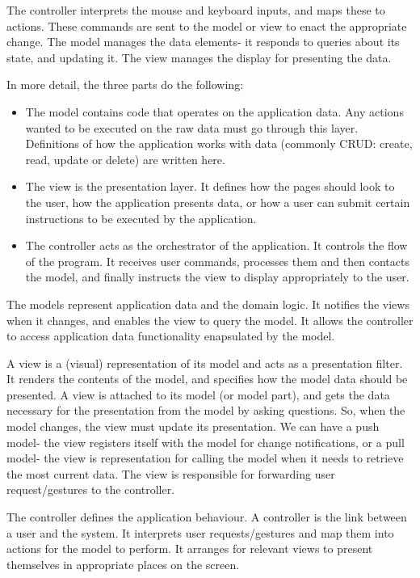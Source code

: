 \documentclass[a4paper, openany]{memoir}
\begin{document}
\noindent The controller interprets the mouse and keyboard inputs, and maps these to actions. These commands are sent to the model or view to enact the appropriate change. The model manages the data elements- it responds to queries about its state, and updating it. The view manages the display for presenting the data.

\noindent In more detail, the three parts do the following:
\begin{itemize}
    \item The model contains code that operates on the application data. Any actions wanted to be executed on the raw data must go through this layer. Definitions of how the application works with data (commonly CRUD: create, read, update or delete) are written here.
    \item The view is the presentation layer. It defines how the pages should look to the user, how the application presents data, or how a user can submit certain instructions to be executed by the application.
    \item The controller acts as the orchestrator of the application. It controls the flow of the program. It receives user commands, processes them and then contacts the model, and finally instructs the view to display appropriately to the user.
\end{itemize}
The models represent application data and the domain logic. It notifies the views when it changes, and enables the view to query the model. It allows the controller to access application data functionality enapsulated by the model.

\noindent A view is a (visual) representation of its model and acts as a presentation filter. It renders the contents of the model, and specifies how the model data should be presented. A view is attached to its model (or model part), and gets the data necessary for the presentation from the model by asking questions. So, when the model changes, the view must update its presentation. We can have a push model- the view registers itself with the model for change notifications, or a pull model- the view is representation for calling the model when it needs to retrieve the most current data. The view is responsible for forwarding user request/gestures to the controller.

\noindent The controller defines the application behaviour. A controller is the link between a user and the system. It interprets user requests/gestures and map them into actions for the model to perform. It arranges for relevant views to present themselves in appropriate places on the screen.
\end{document}
